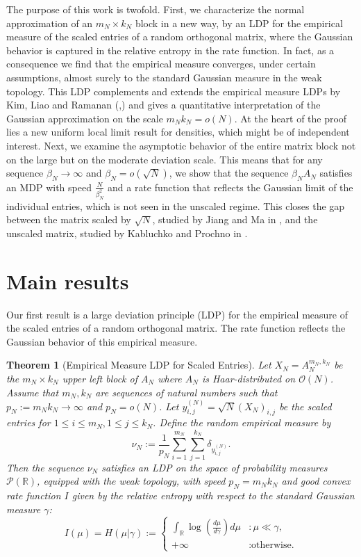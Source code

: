 \documentclass[11pt,a4paper,twoside]{article}
\newcommand{\R}{\mathbb R}
\renewcommand{\O}{\mathcal O}
\newtheorem{thmalpha}{Theorem}
\theoremstyle{definition}
\begin{document}
	The purpose of this work is twofold. First, we characterize the normal approximation of an $m_N\times k_N$ block in a new way, by an LDP for the empirical measure of the scaled entries of a random orthogonal matrix, where the Gaussian behavior is captured in the relative entropy in the rate function. In fact, as a consequence we find that the empirical measure converges, under certain assumptions, almost surely to the standard Gaussian measure in the weak topology. This LDP complements and extends the empirical measure LDPs by Kim, Liao and Ramanan (\cite{kim2021large},\cite{KLR2022}) and gives a quantitative interpretation of the Gaussian approximation on the scale $m_Nk_N = o(N)$. At the heart of the proof lies a new uniform local limit result for densities, which might be of independent interest. Next, we examine the asymptotic behavior of the entire matrix block not on the large but on the moderate deviation scale. This means that for any sequence $\beta_N\to\infty$ and $\beta_N = o(\sqrt{N})$, we show that the sequence $\beta_N A_N$ satisfies an MDP with speed $\frac{N}{\beta_N^2}$ and a rate function that reflects the Gaussian limit of the individual entries, which is not seen in the unscaled regime. This closes the gap between the matrix scaled by $\sqrt{N}$, studied by Jiang and Ma in \cite{DistancesJiang}, and the unscaled matrix, studied by Kabluchko and Prochno in \cite{KabluchkoLarge}. 

\section{Main results}
\label{C:sec:results}
\setcounter{thmalpha}{0}

Our first result is a large deviation principle (LDP) for the empirical measure of the scaled entries of a random orthogonal matrix. The rate function reflects the Gaussian behavior of this empirical measure. 

	\begin{thmalpha}[Empirical Measure LDP for Scaled Entries]\label{thm:empirical_main} 
		Let $X_N = A_N^{m_N, k_N}$ be the $m_N\times k_N$ upper left block of $A_N$ where $A_N$ is Haar-distributed on $\O(N)$. Assume that $m_N, k_N$ are sequences of natural numbers such that $p_N := m_N k_N \to\infty$ and $p_N= o(N)$. Let $y_{i,j}^{(N)} = \sqrt{N} (X_N)_{i,j}$ be the scaled entries for $1\le i \le m_N, 1\le j \le k_N$. Define the random empirical measure by
		$$
		\nu_N := \frac{1}{p_N} \sum_{i=1}^{m_N} \sum_{j=1}^{k_N} \delta_{y_{i,j}^{(N)}}.
		$$
		Then the sequence $\nu_N$ satisfies an LDP on the space of probability measures $\mathcal{P}(\R)$, equipped with the weak topology, with speed $p_N = m_N k_N$ and good convex rate function $I$ given by the relative entropy with respect to the standard Gaussian measure $\gamma$:
		$$
		I(\mu) = H(\mu | \gamma) := \begin{cases} \int_{\R} \log \left( \frac{d\mu}{d\gamma} \right) d \mu & : \mu \ll \gamma, \\ +\infty & :\text{otherwise.} \end{cases}
		$$
	  \end{thmalpha}
\end{document}
